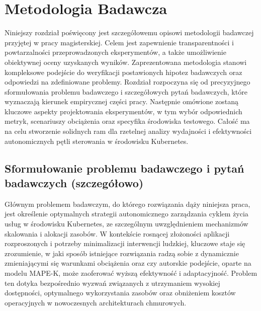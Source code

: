 \newpage
\section{Metodologia Badawcza}
Niniejszy rozdział poświęcony jest szczegółowemu opisowi metodologii badawczej przyjętej w pracy magisterskiej. Celem jest zapewnienie transparentności i powtarzalności przeprowadzonych eksperymentów, a także umożliwienie obiektywnej oceny uzyskanych wyników. Zaprezentowana metodologia stanowi kompleksowe podejście do weryfikacji postawionych hipotez badawczych oraz odpowiedzi na zdefiniowane problemy. Rozdział rozpoczyna się od precyzyjnego sformułowania problemu badawczego i szczegółowych pytań badawczych, które wyznaczają kierunek empirycznej części pracy. Następnie omówione zostaną kluczowe aspekty projektowania eksperymentów, w tym wybór odpowiednich metryk, scenariuszy obciążenia oraz specyfika środowiska testowego. Całość ma na celu stworzenie solidnych ram dla rzetelnej analizy wydajności i efektywności autonomicznych pętli sterowania w środowisku Kubernetes.

\subsection{Sformułowanie problemu badawczego i pytań badawczych (szczegółowo)}
Głównym problemem badawczym, do którego rozwiązania dąży niniejsza praca, jest określenie optymalnych strategii autonomicznego zarządzania cyklem życia usług w środowisku Kubernetes, ze szczególnym uwzględnieniem mechanizmów skalowania i alokacji zasobów. W kontekście rosnącej złożoności aplikacji rozproszonych i potrzeby minimalizacji interwencji ludzkiej, kluczowe staje się zrozumienie, w jaki sposób istniejące rozwiązania radzą sobie z dynamicznie zmieniającymi się warunkami obciążenia oraz czy autorskie podejście, oparte na modelu MAPE-K, może zaoferować wyższą efektywność i adaptacyjność. Problem ten dotyka bezpośrednio wyzwań związanych z utrzymaniem wysokiej dostępności, optymalnego wykorzystania zasobów oraz obniżeniem kosztów operacyjnych w nowoczesnych architekturach chmurowych.

